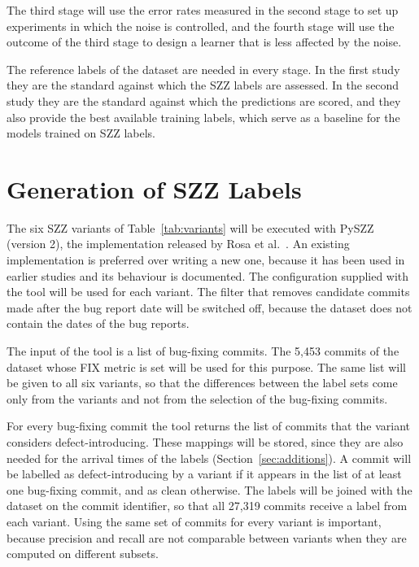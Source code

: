 \documentclass[12pt,a4paper,oneside]{report}
\begin{document}
The third stage will use the error rates measured in the second stage to set
up experiments in which the noise is controlled, and the fourth stage will use
the outcome of the third stage to design a learner that is less affected by
the noise.

The reference labels of the dataset are needed in every stage. In the first
study they are the standard against which the SZZ labels are assessed. In the
second study they are the standard against which the predictions are scored,
and they also provide the best available training labels, which serve as a
baseline for the models trained on SZZ labels.

\section{Generation of SZZ Labels}\label{sec:szz-generation}

The six SZZ variants of Table~\ref{tab:variants} will be executed with PySZZ
(version 2), the implementation released by Rosa et
al.~\cite{rosa2023szzvariants}. An existing implementation is preferred over
writing a new one, because it has been used in earlier studies and its
behaviour is documented. The configuration supplied with the tool will be
used for each variant. The filter that removes candidate commits made after
the bug report date will be switched off, because the dataset does not
contain the dates of the bug reports.

The input of the tool is a list of bug-fixing commits. The 5,453 commits of
the dataset whose FIX metric is set will be used for this purpose. The same
list will be given to all six variants, so that the differences between the
label sets come only from the variants and not from the selection of the
bug-fixing commits.

For every bug-fixing commit the tool returns the list of commits that the
variant considers defect-introducing. These mappings will be stored, since
they are also needed for the arrival times of the labels
(Section~\ref{sec:additions}). A commit will be labelled as defect-introducing
by a variant if it appears in the list of at least one bug-fixing commit, and
as clean otherwise. The labels will be joined with the dataset on the commit
identifier, so that all 27,319 commits receive a label from each variant.
Using the same set of commits for every variant is important, because
precision and recall are not comparable between variants when they are
computed on different subsets.
\end{document}
